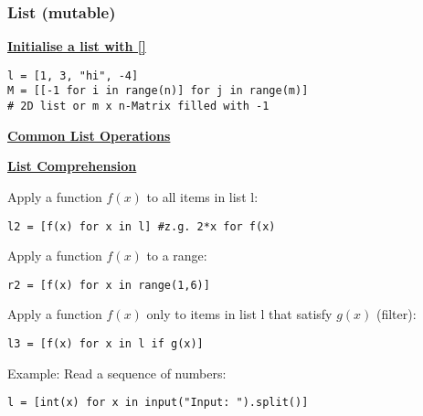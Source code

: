 \subsubsection{List (mutable)}
{\centering\underline{\textbf{Initialise a list with []}} \par}
\begin{lstlisting}
l = [1, 3, "hi", -4]
M = [[-1 for i in range(n)] for j in range(m)]
# 2D list or m x n-Matrix filled with -1
\end{lstlisting}

{\centering\underline{\textbf{Common List Operations}} \par}


{\centering\underline{\textbf{List Comprehension}} \par}
Apply a function $f(x)$ to all items in list l:
\begin{lstlisting}
l2 = [f(x) for x in l] #z.g. 2*x for f(x)
\end{lstlisting}
Apply a function $f(x)$ to a range:
\begin{lstlisting}
r2 = [f(x) for x in range(1,6)]
\end{lstlisting}
Apply a function $f(x)$ only to items in list l that satisfy $g(x)$ (filter):
\begin{lstlisting}
l3 = [f(x) for x in l if g(x)]
\end{lstlisting}
Example: Read a sequence of numbers:
\begin{lstlisting}
l = [int(x) for x in input("Input: ").split()]
\end{lstlisting}